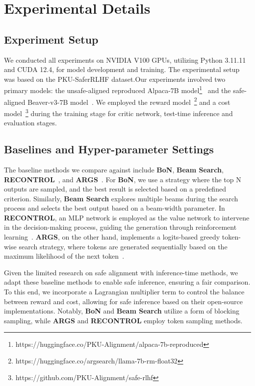 \section{Experimental Details}\label{App:Exps}
\subsection{Experiment Setup}
We conducted all experiments on NVIDIA V100 GPUs, utilizing Python 3.11.11 and CUDA 12.4, for model development and training. The experimental setup was based on the PKU-SaferRLHF dataset.Our experiments involved two primary models: the unsafe-aligned reproduced Alpaca-7B model\footnote{https://huggingface.co/PKU-Alignment/alpaca-7b-reproduced}~\citep{taori2023alpaca} and the safe-aligned Beaver-v3-7B model~\citep{ji2024pku}. We employed the reward model~\cite{khanov2024args}\footnote{https://huggingface.co/argsearch/llama-7b-rm-float32} and a cost model~\cite{ji2024pku}\footnote{https://github.com/PKU-Alignment/safe-rlhf} during the training stage for critic network, test-time inference and evaluation stages. 

\subsection{Baselines and Hyper-parameter Settings}

The baseline methods we compare against include \textbf{BoN}, \textbf{Beam Search}, \textbf{RECONTROL}~\citep{kong2024aligning}, and \textbf{ARGS}~\citep{khanov2024args}. For \textbf{BoN}, we use a strategy where the top N outputs are sampled, and the best result is selected based on a predefined criterion. Similarly, \textbf{Beam Search} explores multiple beams during the search process and selects the best output based on a beam-width parameter. In \textbf{RECONTROL}, an MLP network is employed as the value network to intervene in the decision-making process, guiding the generation through reinforcement learning~\citep{kong2024aligning}. \textbf{ARGS}, on the other hand, implements a logits-based greedy token-wise search strategy, where tokens are generated sequentially based on the maximum likelihood of the next token~\citep{khanov2024args}.

Given the limited research on safe alignment with inference-time methods, we adapt these baseline methods to enable safe inference, ensuring a fair comparison. To this end, we incorporate a Lagrangian multiplier term to control the balance between reward and cost, allowing for safe inference based on their open-source implementations. Notably, \textbf{BoN} and \textbf{Beam Search} utilize a form of blocking sampling, while \textbf{ARGS} and \textbf{RECONTROL} employ token sampling methods. 

